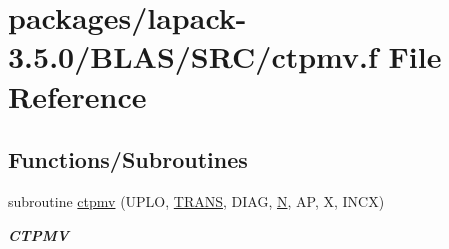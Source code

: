 \hypertarget{lapack-3_85_80_2BLAS_2SRC_2ctpmv_8f}{}\section{packages/lapack-\/3.5.0/\+B\+L\+A\+S/\+S\+R\+C/ctpmv.f File Reference}
\label{lapack-3_85_80_2BLAS_2SRC_2ctpmv_8f}
\subsection*{Functions/\+Subroutines}
\begin{DoxyCompactItemize}
\item 
subroutine \hyperlink{group__complex__blas__level2_gafb7324ce48931e58b392dd6eef9a286c}{ctpmv} (U\+P\+L\+O, \hyperlink{superlu__enum__consts_8h_a0c4e17b2d5cea33f9991ccc6a6678d62a1f61e3015bfe0f0c2c3fda4c5a0cdf58}{T\+R\+A\+N\+S}, D\+I\+A\+G, \hyperlink{polmisc_8c_a0240ac851181b84ac374872dc5434ee4}{N}, A\+P, X, I\+N\+C\+X)
\begin{DoxyCompactList}\small\item\em {\bfseries C\+T\+P\+M\+V} \end{DoxyCompactList}\end{DoxyCompactItemize}
